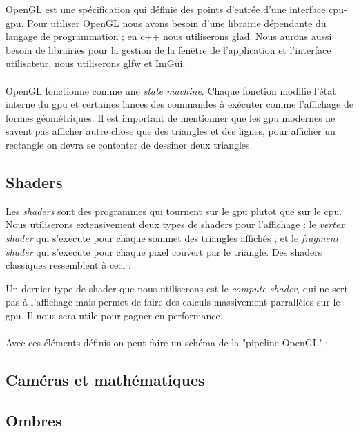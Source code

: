 \documentclass[11pt]{article} %
\begin{document}
OpenGL est une spécification qui définie des points d'entrée d'une interface cpu-gpu. Pour utiliser OpenGL nous avons besoin d'une librairie dépendante du langage de programmation ; en c++ nous utiliserons glad. Nous aurons aussi besoin de librairies pour la gestion de la fenêtre de l'application et l'interface utilisateur, nous utiliserons glfw et ImGui.

\paragraph{}
OpenGL fonctionne comme une \textit{state machine}. Chaque fonction modifie l'état interne du gpu et certaines lances des commandes à exécuter comme l'affichage de formes géométriques.
Il est important de mentionner que les gpu modernes ne savent pas afficher autre chose que des triangles et des lignes, pour afficher un rectangle on devra se contenter de dessiner deux triangles.

\subsection{Shaders}

Les \textit{shaders} sont des programmes qui tournent sur le gpu plutot que sur le cpu. Nous utiliserons extensivement deux types de shaders pour l'affichage : le \textit{vertex shader} qui s'execute pour chaque sommet des triangles affichés ; et le \textit{fragment shader} qui s'execute pour chaque pixel couvert par le triangle. Des shaders classiques ressemblent à ceci :

Un dernier type de shader que nous utiliserons est le \textit{compute shader}, qui ne sert pas à l'affichage mais permet de faire des calculs massivement parrallèles sur le gpu. Il nous sera utile pour gagner en performance.

\paragraph{}
Avec ces éléments définis on peut faire un schéma de la "pipeline OpenGL" :


\subsection{Caméras et mathématiques}

\subsection{Ombres}
\end{document}

